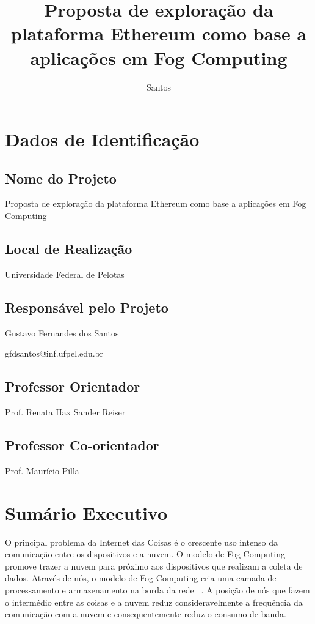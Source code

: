 \documentclass[tcc-proposta]{texufpel}
\title{Proposta de exploração da plataforma Ethereum como base a aplicações em Fog Computing}
\author{Santos}{Gustavo Fernandes dos}
\begin{document}
	
	\renewcommand{\advisorname}{Orientadora}           %
	
\maketitle 
\sloppy
	
\chapter{Dados de Identificação}
	
\section{Nome do Projeto}
Proposta de exploração da plataforma Ethereum como base a aplicações em Fog Computing
	
\section{Local de Realização}
Universidade Federal de Pelotas
	
\section{Responsável pelo Projeto}
Gustavo Fernandes dos Santos
	
gfdsantos@inf.ufpel.edu.br
	
\section{Professor Orientador}
Prof. Renata Hax Sander Reiser
	
\section{Professor Co-orientador}
Prof. Maurício Pilla
	
\chapter{Sumário Executivo}
	
O principal problema da Internet das Coisas é o crescente uso intenso da comunicação entre os dispositivos e a nuvem. O modelo de Fog Computing promove trazer a nuvem para próximo aos dispositivos que realizam a coleta de dados. Através de nós, o modelo de Fog Computing cria uma camada de processamento e armazenamento na borda da rede ~\cite{Bonomi2012}. A posição de nós que fazem o intermédio entre as coisas e a nuvem reduz consideravelmente a frequência da comunicação com a nuvem e consequentemente reduz o consumo de banda.
	
\end{document}
